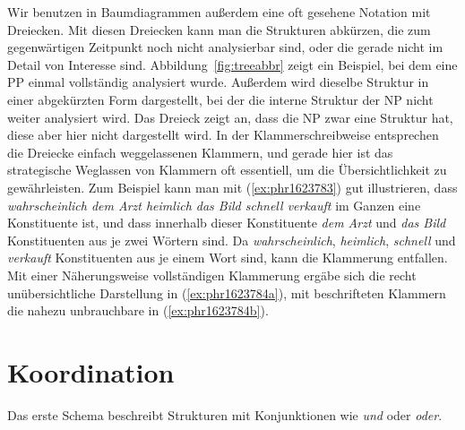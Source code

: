 Wir benutzen in Baumdiagrammen außerdem eine oft gesehene Notation mit Dreiecken.
Mit diesen Dreiecken kann man die Strukturen abkürzen, die zum gegenwärtigen Zeitpunkt noch nicht analysierbar sind, oder die gerade nicht im Detail von Interesse sind.
Abbildung~\ref{fig:treeabbr} zeigt ein Beispiel, bei dem eine PP einmal vollständig analysiert wurde.
Außerdem wird dieselbe Struktur in einer abgekürzten Form dargestellt, bei der die interne Struktur der NP nicht weiter analysiert wird.
Das Dreieck zeigt an, dass die NP zwar eine Struktur hat, diese aber hier nicht dargestellt wird.
In der Klammerschreibweise entsprechen die Dreiecke einfach weggelassenen Klammern, und gerade hier ist das strategische Weglassen von Klammern oft essentiell, um die Übersichtlichkeit zu gewährleisten.
Zum Beispiel kann man mit (\ref{ex:phr1623783}) gut illustrieren, dass \textit{wahrscheinlich dem Arzt heimlich das Bild schnell verkauft} im Ganzen eine Konstituente ist, und dass innerhalb dieser Konstituente \textit{dem Arzt} und \textit{das Bild} Konstituenten aus je zwei Wörtern sind.
Da \textit{wahrscheinlich}, \textit{heimlich}, \textit{schnell} und \textit{verkauft} Konstituenten aus je einem Wort sind, kann die Klammerung entfallen.
Mit einer Näherungsweise vollständigen Klammerung ergäbe sich die recht unübersichtliche Darstellung in (\ref{ex:phr1623784a}), mit beschrifteten Klammern die nahezu unbrauchbare in (\ref{ex:phr1623784b}).

\begin{exe}
  \ex\label{ex:phr1623784}
  \begin{xlist}
  \end{xlist}
\end{exe}


\section{Koordination}

\label{sec:koor}

Das erste Schema beschreibt Strukturen mit Konjunktionen wie \textit{und} oder \textit{oder}.

